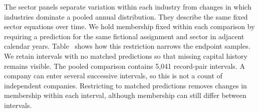 The sector panels separate variation within each industry from changes in which industries dominate a pooled annual distribution. They describe the same fixed sector equations over time.
We hold membership fixed within each comparison by requiring a prediction for the same fictional assignment and sector in adjacent calendar years. Table~ shows how this restriction narrows the endpoint samples. We retain intervals with no matched predictions so that missing capital history remains visible.
The pooled comparison contains 5,041 record-pair intervals. A company can enter several successive intervals, so this is not a count of independent companies. Restricting to matched predictions removes changes in membership within each interval, although membership can still differ between intervals.

